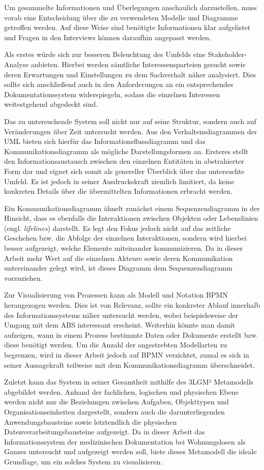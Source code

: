 Um gesammelte Informationen und Überlegungen anschaulich darzustellen, muss vorab eine Entscheidung über die zu verwendeten Modelle und Diagramme getroffen werden. Auf diese Weise sind benötigte Informationen klar aufgelistet und Fragen in den Interviews können daraufhin angepasst werden.

Als erstes würde sich zur besseren Beleuchtung des Umfelds eine Stakeholder-Analyse anbieten. Hierbei werden sämtliche Interessensparteien gesucht sowie deren Erwartungen und Einstellungen zu dem Sachverhalt näher analysiert. Dies sollte sich anschließend auch in den Anforderungen an ein entsprechendes Dokumentationssystem widerspiegeln, sodass die einzelnen Interessen weitestgehend abgedeckt sind.

Das zu untersuchende System soll nicht nur auf seine Struktur, sondern auch auf Veränderungen über Zeit untersucht werden. Aus den Verhaltensdiagrammen der UML bieten sich hierfür das Informationsflussdiagramm und das Kommunikationsdiagramm als mögliche Darstellungsformen an. Ersteres stellt den Informationsaustausch zwischen den einzelnen Entitäten in abstrahierter Form dar und eignet sich somit als genereller Überblick über das untersuchte Umfeld. Es ist jedoch in seiner Ausdruckskraft ziemlich limitiert, da keine konkreten Details über die übermittelten Informationen erbracht werden.

Ein Kommunikationsdiagramm ähnelt zunächst einem Sequenzendiagramm in der Hinsicht, dass es ebenfalls die Interaktionen zwischen Objekten oder Lebenslinien (engl. \textit{lifelines}) darstellt. Es legt den Fokus jedoch nicht auf das zeitliche Geschehen bzw. die Abfolge der einzelnen Interaktionen, sondern wird hierbei besser aufgezeigt, welche Elemente miteinander kommunizieren. Da in dieser Arbeit mehr Wert auf die einzelnen Akteure sowie deren Kommunikation untereinander gelegt wird, ist dieses Diagramm dem Sequenzendiagramm vorzuziehen.

Zur Visualisierung von Prozessen kann als Modell und Notation BPMN herangezogen werden. Dies ist von Relevanz, sollte ein konkreter Ablauf innerhalb des Informationssystems näher untersucht werden, wobei beispielsweise der Umgang mit dem ABS interessant erscheint. Weiterhin könnte man damit aufzeigen, wann in einem Prozess bestimmte Daten oder Dokumente erstellt bzw. diese benötigt werden. Um die Anzahl der angestrebten Modellarten zu begrenzen, wird in dieser Arbeit jedoch auf BPMN verzichtet, zumal es sich in seiner Aussagekraft teilweise mit dem Kommunikationsdiagramm überschneidet.

Zuletzt kann das System in seiner Gesamtheit mithilfe des 3LGM² Metamodells abgebildet werden. Anhand der fachlichen, logischen und physischen Ebene werden nicht nur die Beziehungen zwischen Aufgaben, Objekttypen und Organisationseinheiten dargestellt, sondern auch die darunterliegenden Anwendungsbausteine sowie letztendlich die physischen Datenverarbeitungsbausteine aufgezeigt. Da in dieser Arbeit das Informationssystem der medizinischen Dokumentation bei Wohnungslosen als Ganzes untersucht und aufgezeigt werden soll, biete dieses Metamodell die ideale Grundlage, um ein solches System zu visualisieren.

